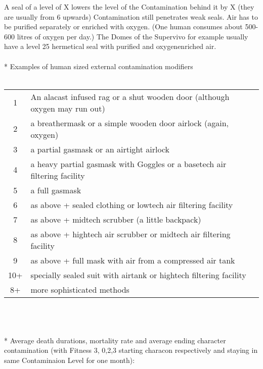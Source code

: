 \documentclass{article}
\begin{document}
    A seal of a level of X lowers the level of the Contamination behind it by X (they are usually from 6 upwards)
    Contamination still penetrates weak seals. Air has to be purified separately or enriched with oxygen.
    (One human consumes about 500-600 litres of oxygen per day.) The Domes of the Supervivo for
    example usually have a level 25 hermetical seal with purified and oxygenenriched air.\\\\*
    Examples of human sized external contamination modifiers\\\\
    \begin{tabular}{cl}
        1& An alacast infused rag or a shut wooden door (although oxygen may run out)\\
        2& a breathermask or a simple wooden door airlock (again, oxygen)\\
        3& a partial gasmask  or an airtight airlock\\
        4& a heavy partial gasmask with Goggles or a basetech air filtering facility\\
        5& a full gasmask\\
        6& as above + sealed clothing or lowtech air filtering facility\\
        7& as above + midtech scrubber (a little backpack)\\
        8& as above + hightech air scrubber or midtech air filtering facility\\
        9& as above + full mask with air from a compressed air tank\\
       10+& specially sealed suit with airtank or hightech filtering facility\\

        8+& more sophisticated methods\\
    \end{tabular}\\\\\\*
    Average death durations, mortality rate and average ending character contamination
    (with Fitness 3, 0,2,3 starting characon respectively and staying in same Contaminaion Level for one month):\\\\
\end{document}
